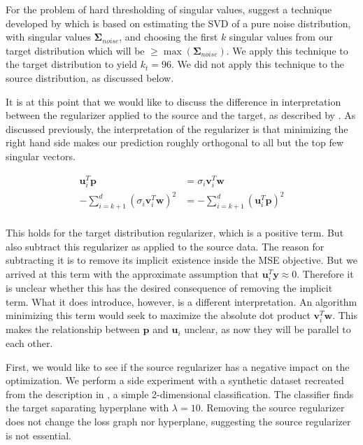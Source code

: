 \documentclass[twoside,11pt]{article}
\begin{document}
For the problem of hard thresholding of singular values, \cite{brunton_kutz_2019} suggest a technique developed by \cite{gavish2014optimal} which is based on estimating the SVD of a pure noise distribution, with singular values $\mathbf{\Sigma}_{noise}$, and choosing the first $k$ singular values from our target distribution which will be $\geq \max(\mathbf{\Sigma}_{noise})$. We apply this technique to the target distribution to yield $k_t = 96$. We did not apply this technique to the source distribution, as discussed below.

It is at this point that we would like to discuss the difference in interpretation between the regularizer applied to the source and the target, as described by \cite{imani2022label}. As discussed previously, the interpretation of the regularizer is that minimizing the right hand side makes our prediction roughly orthogonal to all but the top few singular vectors.

$$
\begin{aligned}
\mathbf{u}_i^T \mathbf{p} &= \sigma_i \mathbf{v}_i^T \mathbf{w}\\
-\sum_{i=k+1}^d (\sigma_i \mathbf{v}_i^T \mathbf{w} )^2 &= -\sum_{i=k+1}^d (\mathbf{u}_i^T \mathbf{p} )^2\\
\end{aligned}
$$

This holds for the target distribution regularizer, which is a positive term. But \cite{imani2022label} also subtract this regularizer as applied to the source data. The reason for subtracting it is to remove its implicit existence inside the MSE objective. But we arrived at this term with the approximate assumption that $\mathbf{u}_i^T \mathbf{y} \approx 0$. Therefore it is unclear whether this has the desired consequence of removing the implicit term. What it does introduce, however, is a different interpretation. An algorithm minimizing this term would seek to maximize the absolute dot product $\mathbf{v}_i^T \mathbf{w}$. This makes the relationship between $\mathbf{p}$ and $\mathbf{u}_i$ unclear, as now they will be parallel to each other. 

First, we would like to see if the source regularizer has a negative impact on the optimization. We perform a side experiment with a synthetic dataset recreated from the description in \cite{imani2022label}, a simple 2-dimensional classification. The classifier finds the target saparating hyperplane with $\lambda = 10$. Removing the source regularizer does not change the loss graph nor hyperplane, suggesting the source regularizer is not essential.
\end{document}
